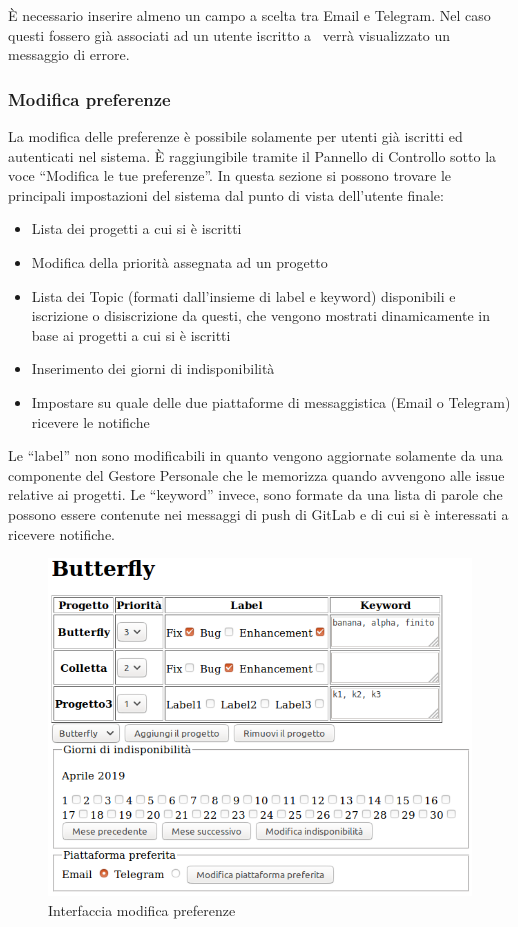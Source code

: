 È necessario inserire almeno un campo a scelta tra Email e Telegram.
Nel caso questi fossero già associati ad un utente iscritto a \progetto\ verrà visualizzato un messaggio di errore.

\subsubsection{Modifica preferenze}\label{preferenze}
La modifica delle preferenze è possibile solamente per utenti già iscritti ed autenticati nel sistema.
È raggiungibile tramite il Pannello di Controllo sotto la voce ``Modifica le tue preferenze''.
In questa sezione si possono trovare le principali impostazioni del sistema dal punto di vista dell'utente finale:
\begin{itemize}
	\item Lista dei progetti a cui si è iscritti
	\item Modifica della priorità assegnata ad un progetto
	\item Lista dei Topic (formati dall'insieme di label e keyword) disponibili e iscrizione o disiscrizione da questi, che vengono mostrati dinamicamente in base ai progetti a cui si è iscritti
	\item Inserimento dei giorni di indisponibilità
	\item Impostare su quale delle due piattaforme di messaggistica (Email o Telegram) ricevere le notifiche
\end{itemize}
Le ``label'' non sono modificabili in quanto vengono aggiornate solamente da una componente del Gestore Personale che le memorizza quando avvengono  alle issue relative ai progetti.
Le ``keyword'' invece, sono formate da una lista di parole che possono essere contenute nei messaggi di push di GitLab e di cui si è interessati a ricevere notifiche.
\begin{figure}[H]
	\centering
	\includegraphics[width=12cm]{img/preferenze_1.png}
	\caption{Interfaccia modifica preferenze}
\end{figure}

